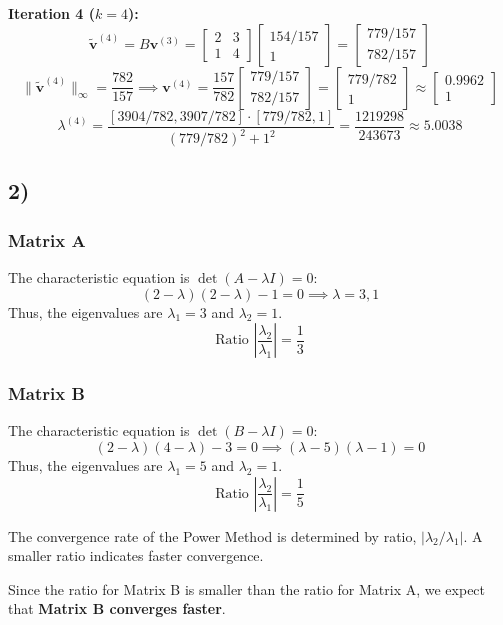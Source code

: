 \documentclass{article}
\newcommand{\0}{{\mathbf{0}}} %
\begin{document}
\textbf{Iteration 4 ($k=4$):}
\[
\tilde{\mathbf{v}}^{(4)} = B \mathbf{v}^{(3)} =
\begin{bmatrix} 2 & 3 \\ 1 & 4
\end{bmatrix}
\begin{bmatrix} 154/157 \\ 1
\end{bmatrix} =
\begin{bmatrix} 779/157 \\ 782/157
\end{bmatrix}
\]
\[
\|\tilde{\mathbf{v}}^{(4)}\|_\infty = \frac{782}{157} \implies \mathbf{v}^{(4)} = \frac{157}{782}
\begin{bmatrix} 779/157 \\ 782/157
\end{bmatrix} =
\begin{bmatrix} 779/782 \\ 1
\end{bmatrix} \approx
\begin{bmatrix} 0.9962 \\ 1
\end{bmatrix}
\]
\[
\lambda^{(4)} = \frac{[3904/782, 3907/782] \cdot [779/782, 1]}{(779/782)^2 + 1^2} = \frac{1219298}{243673} \approx \mathbf{5.0038}
\]

\subsection*{2)}
\subsubsection*{Matrix A}
The characteristic equation is $\det(A - \lambda I) = 0$:
\[
(2-\lambda)(2-\lambda) - 1 = 0 \implies \lambda = 3, 1
\]
Thus, the eigenvalues are $\lambda_1 = 3$ and $\lambda_2 = 1$.
\[
\text{Ratio } \left| \frac{\lambda_2}{\lambda_1} \right| = \frac{1}{3}
\]

\subsubsection*{Matrix B}
The characteristic equation is $\det(B - \lambda I) = 0$:
\[
(2-\lambda)(4-\lambda) - 3 = 0 \implies(\lambda-5)(\lambda-1)=0
\]
Thus, the eigenvalues are $\lambda_1 = 5$ and $\lambda_2 = 1$.
\[
\text{Ratio } \left| \frac{\lambda_2}{\lambda_1} \right| = \frac{1}{5}
\]

The convergence rate of the Power Method is determined by ratio, $|\lambda_2 / \lambda_1|$. A smaller ratio indicates faster convergence.

Since the ratio for Matrix B is smaller than the ratio for Matrix A, we expect that \textbf{Matrix B converges faster}.
\end{document}
